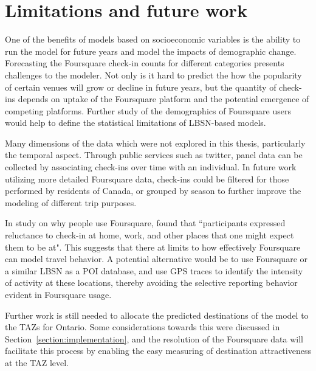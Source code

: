 \section{Limitations and future work}
One of the benefits of models based on socioeconomic variables is the ability to run the model for future years and model the impacts of demographic change. Forecasting the Foursquare check-in counts for different categories presents challenges to the modeler. Not only is it hard to predict the how the popularity of certain venues will grow or decline in future years, but the quantity of check-ins depends on uptake of the Foursquare platform and the potential emergence of competing platforms. Further study of the demographics of Foursquare users would help to define the statistical limitations of LBSN-based models. 

Many dimensions of the data which were not explored in this thesis,  particularly the temporal aspect. Through public services such as twitter, panel data can be collected by associating check-ins over time with an individual. In future work utilizing more detailed Foursquare data, check-ins could be filtered for those performed by residents of Canada, or grouped by season to further improve the modeling of different trip purposes. 

In study on why people use Foursquare, \textcite{lindqvist2011m} found that ``participants expressed reluctance to check-in at home, work, and other places that one might expect them to be at". This suggests that there at limits to how effectively Foursquare can model travel behavior. A potential alternative would be to use Foursquare or a similar LBSN as a POI database, and use GPS traces to identify the intensity of activity at these locations, thereby avoiding the selective reporting behavior evident in Foursquare usage. 

Further work is still needed to allocate the predicted destinations of the model to the TAZs for Ontario. Some considerations towards this were discussed in Section~\ref{section:implementation}, and the resolution of the Foursquare data will facilitate this process by enabling the easy measuring of destination attractiveness at the TAZ level.

